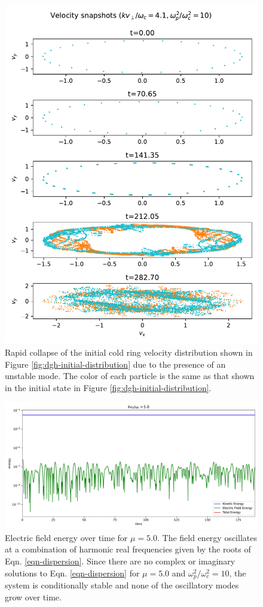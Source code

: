 \documentclass[%
 reprint,
 amsmath,amssymb,
 aps,
]{revtex4-2}
\begin{document}
\begin{figure}
\includegraphics[width=0.9\linewidth]{proj4/snapshots_velocity_phase_space.pdf}
\caption{\label{fig:snapshots-velocity-phase}Rapid collapse of the initial cold ring velocity distribution shown in Figure \ref{fig:dgh-initial-distribution} due to the presence of an unstable mode. The color of each particle is the same as that shown in the initial state in Figure \ref{fig:dgh-initial-distribution}.}
\end{figure}

\begin{figure}
\includegraphics[width=0.9\linewidth]{proj4/dgh_5.0.pdf}
\caption{\label{fig:dory-guest-harris-5.0}Electric field energy over time for $\mu = 5.0$. The field energy oscillates at a combination of harmonic real frequencies given by the roots of Eqn. \ref{eqn-dispersion}. Since there are no complex or imaginary solutions to Eqn. \ref{eqn-dispersion} for $\mu = 5.0$ and $\omega_p ^2 / \omega_c ^2 = 10$, the system is conditionally stable and none of the oscillatory modes grow over time.}
\end{figure}
\end{document}
